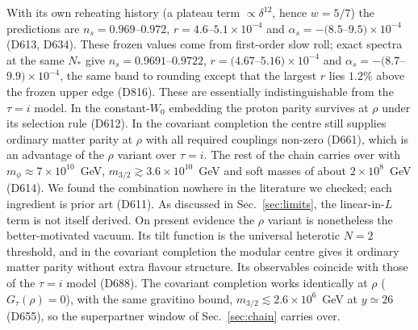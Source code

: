 \documentclass[aps,prd,twocolumn,superscriptaddress,nofootinbib,floatfix]{revtex4-2}
\begin{document}
With its own reheating history (a plateau term $\propto\delta^{12}$, hence $w = 5/7$) the predictions are $n_s = 0.969$--$0.972$, $r = 4.6$--$5.1\times10^{-4}$ and $\alpha_s = -(8.5$--$9.5)\times10^{-4}$ (D613, D634). These frozen values come from first-order slow roll; exact spectra at the same $N_*$ give $n_s=0.9691$--$0.9722$, $r=(4.67$--$5.16)\times10^{-4}$ and $\alpha_s=-(8.7$--$9.9)\times10^{-4}$, the same band to rounding except that the largest $r$ lies $1.2\%$ above the frozen upper edge (D816). These are essentially indistinguishable from the $\tau = i$ model. In the constant-$W_0$ embedding the proton parity survives at $\rho$ under its selection rule (D612). In the covariant completion the centre still supplies ordinary matter parity at $\rho$ with all required couplings non-zero (D661), which is an advantage of the $\rho$ variant over $\tau=i$. The rest of the chain carries over with $m_\phi \approx 7\times10^{10}$~GeV, $m_{3/2} \gtrsim 3.6\times10^{10}$~GeV and soft masses of about $2\times10^8$~GeV (D614). We found the combination nowhere in the literature we checked; each ingredient is prior art (D611). As discussed in Sec.~\ref{sec:limits}, the linear-in-$L$ term is not itself derived. On present evidence the $\rho$ variant is nonetheless the better-motivated vacuum. Its tilt function is the universal heterotic $N=2$ threshold, and in the covariant completion the modular centre gives it ordinary matter parity without extra flavour structure. Its observables coincide with those of the $\tau=i$ model (D688). The covariant completion works identically at $\rho$ ($G_\tau(\rho)=0$), with the same gravitino bound, $m_{3/2}\lesssim2.6\times10^6$~GeV at $y\simeq26$ (D655), so the superpartner window of Sec.~\ref{sec:chain} carries over.
\end{document}
